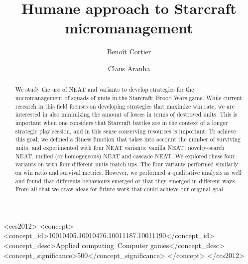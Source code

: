 \documentclass[sigconf, authordraft, anonymous]{acmart}
\begin{document}
\title{Humane approach to Starcraft micromanagement}

\author{Benoît Cortier}

\author{Claus Aranha}

\begin{abstract}
We study the use of NEAT and variants to develop strategies for the
micromanagement of squads of units in the Starcraft: Brood Wars game.
While current research in this field focuses on developing strategies
that maximize win rate, we are interested in also minimizing the amount
of losses in terms of destroyed units. This is important when one considers
that Starcraft battles are in the context of a longer strategic play session,
and in this sense conserving resources is important. To achieve this goal,
we defined a fitness function that takes into account the number of
surviving units, and experimented with four NEAT variants: vanilla NEAT,
novelty-search NEAT, unified (or homogeneous) NEAT and cascade NEAT. We
explored these four variants on with four different units match ups. The
four variants performed similarly on win ratio and survival metrics.
However, we performed a qualitative analysis as well and found that differents
behaviours emerged or that they emerged in different ways. From all that we draw
ideas for future work that could achieve our original goal.
\end{abstract}

\begin{CCSXML}
<ccs2012>
<concept>
<concept_id>10010405.10010476.10011187.10011190</concept_id>
<concept_desc>Applied computing~Computer games</concept_desc>
<concept_significance>500</concept_significance>
</concept>
</ccs2012>
\end{CCSXML}

\end{document}
